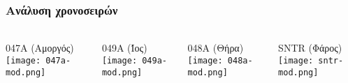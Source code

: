 \begin{frame}
  \frametitle{Ανάλυση χρονοσειρών}
  \framesubtitle{}
  \label{}
  \vskip-1cm
  \begin{columns}[T]
    \begin{column}{.25\textwidth}
      \begin{center}
      {\scriptsize 047A (Αμοργός)}
        \texttt{[image: 047a-mod.png]}
      \end{center}  
    \end{column}
    \begin{column}{.25\textwidth}
      \begin{center}
       {\scriptsize 049A (Ίος)}
        \texttt{[image: 049a-mod.png]}
      \end{center}       
    \end{column}
  \begin{column}{.25\textwidth}
      \begin{center}
       {\scriptsize 048A (Θήρα)}
        \texttt{[image: 048a-mod.png]}
      \end{center}  
    \end{column}
    \begin{column}{.25\textwidth}
      \begin{center}
       {\scriptsize SNTR (Φάρος)}
        \texttt{[image: sntr-mod.png]}
      \end{center}       
    \end{column}
  \end{columns}  
  
\end{frame}
\note{}

\note{}



